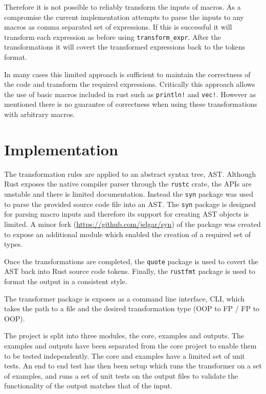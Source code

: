 \documentclass[ oneside,%
                    author={James Elgar},
                    degree={MEng},
                     title={Bidirectional transformer between functional and \\ object-oriented programming in Rust},
                  subtitle={}]{dissertation}
\newcommand{\rust}[1]{\texttt{#1}}
\begin{document}
Therefore it is not possible to reliably transform the inputs of macros. As a compromise the current implementation attempts to parse the inputs to any macros as comma separated set of expressions. If this is successful it will transform each expression as before using \verb|transform_expr|. After the transformations it will covert the transformed expressions back to the tokens format.

In many cases this limited approach is sufficient to maintain the correctness of the code and transform the required expressions. Critically this approach allows the use of basic macros included in rust such as \rust{println!} and \rust{vec!}. However as mentioned there is no guarantee of correctness when using these transformations with arbitrary macros.

\section{Implementation}

The transformation rules are applied to an abstract syntax tree, AST. 
Although Rust exposes the native compiler parser through the \verb|rustc| crate, the APIs are unstable and there is limited documentation. Instead the \verb|syn| package was used to parse the provided source code file into an AST. 
The \verb|syn| package is designed for parsing macro inputs and therefore its support for creating AST objects is limited. A minor fork (\url{https://github.com/jelgar/syn}) of the package was created to expose an additional module which enabled the creation of a required set of types.

Once the transformations are completed, the \verb|quote| package is used to covert the AST back into Rust source code tokens. Finally, the \verb|rustfmt| package is used to format the output in a consistent style.

The transformer package is exposes as a command line interface, CLI, which takes the path to a file and the desired transformation type (OOP to FP / FP to OOP). 

The project is split into three modules, the core, examples and outputs. The examples and outputs have been separated from the core project to enable them to be tested independently. The core and examples have a limited set of unit tests. An end to end test has then been setup which runs the transformer on a set of examples, and runs a set of unit tests on the output files to validate the functionality of the output matches that of the input.
\end{document}
